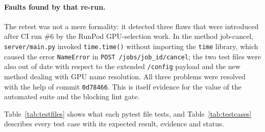 \paragraph{Faults found by that re-run.} The retest was not a mere formality: it detected three flaws that were introduced after CI run \#6 by the RunPod GPU-selection work. In the method job-cancel, \texttt{server/main.py} invoked \texttt{time.time()} without importing the \texttt{time} library, which caused the error \texttt{NameError} in \texttt{POST /jobs/job\_id/cancel}; the two test files were also out of date with respect to the extended \texttt{/config} payload and the new method dealing with GPU name resolution. All three problems were resolved with the help of commit \texttt{0d78466}. This is itself evidence for the value of the automated suite and the blocking lint gate.

Table~\ref{tab:testfiles} shows what each pytest file tests, and Table~\ref{tab:testcases} describes every test case with its expected result, evidence and status.

